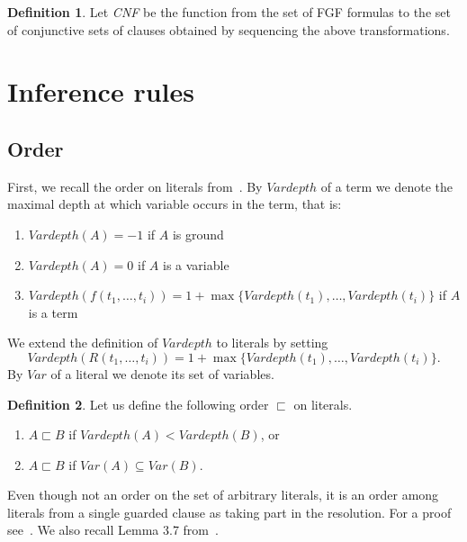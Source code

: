 \documentclass[english, shortabstract]{iithesis}
\theoremstyle{definition} \newtheorem{definition}{Definition}[chapter]
\theoremstyle{remark} \newtheorem{remark}[definition]{Observation}
\theoremstyle{plain} \newtheorem{theorem}[definition]{Theorem}
\theoremstyle{plain} \newtheorem{lemma}[definition]{Lemma}
\begin{document}
\begin{definition}
Let \emph{CNF} be the function from the set of FGF formulas to the set of conjunctive sets of clauses obtained by sequencing the above transformations.
\end{definition}

\section{Inference rules}\label{section:inference}

\subsection{Order}

First, we recall the order on literals from~\cite{nivelle}.
By $\mathit{Vardepth}$ of a term we denote the maximal depth at which variable occurs in the term, that is:
\begin{enumerate}
    \item $\mathit{Vardepth}(A)=-1$ if $A$ is ground
    \item $\mathit{Vardepth}(A)=0$ if $A$ is a variable
    \item $\mathit{Vardepth}(f(t_1,\dots, t_i))=1+\max\{\mathit{Vardepth}(t_1), \dots, \mathit{Vardepth}(t_i)\}$ if $A$ is a term
\end{enumerate}
We extend the definition of $\mathit{Vardepth}$ to literals by setting $$\mathit{Vardepth}(R(t_1, \dots, t_i))=1+\max\{\mathit{Vardepth}(t_1), \dots, \mathit{Vardepth}(t_i)\}.$$ 
By $\mathit{Var}$ of a literal we denote its set of variables.
\begin{definition}\label{def:order}
Let us define the following order $\sqsubset$ on literals.
\begin{enumerate}
    \item $A \sqsubset B$ if $\mathit{Vardepth}(A) < \mathit{Vardepth}(B)$, or
    \item $A \sqsubset B$ if $\mathit{Var}(A) \subseteq \mathit{Var}(B)$.
\end{enumerate}
\end{definition}
Even though not an order on the set of arbitrary literals, it is an order among literals from a single guarded clause as taking part in the resolution.
For a proof see~\cite{nivelle}. We also recall Lemma 3.7 from~\cite{nivelle}.
\end{document}
